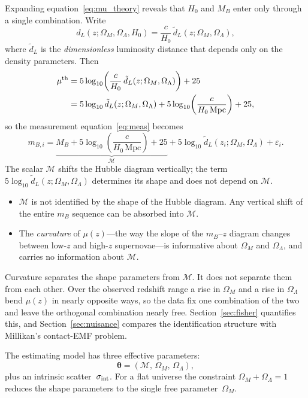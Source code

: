 \documentclass[12pt]{article}
\begin{document}
Expanding equation~\eqref{eq:mu_theory} reveals that $H_0$ and $M_B$
enter only through a single combination.  Write
\begin{equation}\label{eq:dl_split}
  d_L(z;\Omega_M,\Omega_\Lambda,H_0)
  = \frac{c}{H_0}\,\tilde d_L(z;\Omega_M,\Omega_\Lambda),
\end{equation}
where $\tilde d_L$ is the \emph{dimensionless} luminosity distance that
depends only on the density parameters.  Then
\begin{align}
  \mu^{\rm th} &= 5\log_{10}\!\left(\frac{c}{H_0}\,
    \tilde d_L(z;\Omega_M,\Omega_\Lambda)\right) + 25 \notag \\
  &= 5\log_{10}\tilde d_L(z;\Omega_M,\Omega_\Lambda)
    + 5\log_{10}\!\left(\frac{c}{H_0\,\text{Mpc}}\right) + 25,
\end{align}
so the measurement equation~\eqref{eq:meas} becomes
\begin{equation}\label{eq:meas2}
  m_{B,i} = \underbrace{M_B + 5\log_{10}\!\left(\frac{c}{H_0\,\text{Mpc}}\right) + 25}_{
    \displaystyle\mathcal{M}}
    + 5\log_{10}\tilde d_L(z_i;\Omega_M,\Omega_\Lambda) + \varepsilon_i.
\end{equation}
The scalar $\mathcal{M}$ shifts the Hubble diagram vertically; the term
$5\log_{10}\tilde d_L(z;\Omega_M,\Omega_\Lambda)$ determines its shape and
does not depend on $\mathcal{M}$.
\begin{itemize}
  \item $\mathcal{M}$ is not identified by the shape of the Hubble
    diagram.  Any vertical shift of the entire $m_B$ sequence can be
    absorbed into $\mathcal{M}$.
  \item The \emph{curvature} of $\mu(z)$---the way the slope of the
    $m_B$--$z$ diagram changes between low-$z$ and high-$z$ supernovae---is
    informative about $\Omega_M$ and $\Omega_\Lambda$, and carries no
    information about $\mathcal{M}$.
\end{itemize}
Curvature separates the shape parameters from $\mathcal{M}$.  It does not
separate them from each other.  Over the observed redshift range a rise in
$\Omega_M$ and a rise in $\Omega_\Lambda$ bend $\mu(z)$ in nearly opposite
ways, so the data fix one combination of the two and leave the orthogonal
combination nearly free.  Section~\ref{sec:fisher} quantifies this, and
Section~\ref{sec:nuisance} compares the identification structure with
Millikan's contact-EMF problem.

The estimating model has three effective parameters:
\begin{equation}\label{eq:param_set}
  \boldsymbol\theta = (\mathcal{M},\,\Omega_M,\,\Omega_\Lambda),
\end{equation}
plus an intrinsic scatter~$\sigma_{\rm int}$.  For a flat universe the
constraint $\Omega_M + \Omega_\Lambda = 1$ reduces the shape parameters
to the single free parameter~$\Omega_M$.
\end{document}
